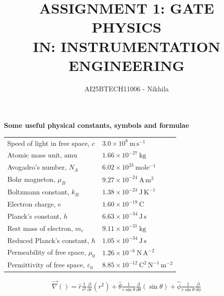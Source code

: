 \documentclass[journal,13pt,onecolumn]{IEEEtran}
\begin{document}
\title{
ASSIGNMENT 1: GATE PHYSICS \\
IN: INSTRUMENTATION ENGINEERING}
\author{AI25BTECH11006 - Nikhila }
\maketitle

\renewcommand{\thefigure}{\theenumi}
\renewcommand{\thetable}{\theenumi}

\vspace{6em} 



\noindent\textbf{\large Some useful physical constants, symbols and formulae}


\vspace{6em}

\begin{tabular}{ l l }
Speed of light in free space, $c$ & $3.0 \times 10^8\ \mathrm{m\,s^{-1}}$ \\
Atomic mass unit, $\mathrm{amu}$ & $1.66 \times 10^{-27}\ \mathrm{kg}$ \\
Avogadro's number, $N_A$ & $6.02 \times 10^{23}\ \mathrm{mole^{-1}}$ \\
Bohr magneton, $\mu_B$ & $9.27 \times 10^{-24}\ \mathrm{A\,m^2}$ \\
Boltzmann constant, $k_B$ & $1.38 \times 10^{-23}\ \mathrm{J\,K^{-1}}$ \\
Electron charge, $e$ & $1.60 \times 10^{-19}\ \mathrm{C}$ \\
Planck's constant, $h$ & $6.63 \times 10^{-34}\ \mathrm{J\,s}$ \\
Rest mass of electron, $m_e$ & $9.11 \times 10^{-31}\ \mathrm{kg}$ \\
Reduced Planck's constant, $\hbar$ & $1.05 \times 10^{-34}\ \mathrm{J\,s}$ \\
Permeability of free space, $\mu_0$ & $1.26 \times 10^{-6}\ \mathrm{N\,A^{-2}}$ \\
Permittivity of free space, $\varepsilon_0$ & $8.85 \times 10^{-12}\ \mathrm{C^2\,N^{-1}\,m^{-2}}$
\end{tabular}

\vspace{6em}
\noindent 

\begin{align*}
\vec{\nabla}() = \hat{r} \frac{1}{r^2} \frac{\partial}{\partial r} \left( r^2 \right)
+ \hat{\theta} \frac{1}{r \sin\theta} \frac{\partial}{\partial \theta} (\sin\theta)
+ \hat{\phi} \frac{1}{r\sin\theta} \frac{\partial}{\partial\phi}
\end{align*}
\end{document}
